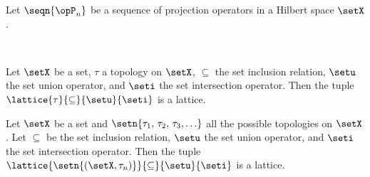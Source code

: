 \begin{minipage}[c]{\tw-40mm}
\begin{example}
\footnotemark
Let $\seqn{\opP_n}$ be a sequence of projection operators in a Hilbert space $\setX$.
\end{example}
\end{minipage}%
\hfill%
%
\hfill{}\hfill\mbox{}\\%

\begin{example}
Let $\setX$ be a set, $\tau$ a topology on $\setX$,
$\subseteq$ the set inclusion relation,
$\setu$ the set union operator,
and $\seti$ the set intersection operator.
Then the tuple $\lattice{\tau}{\subseteq}{\setu}{\seti}$ is a lattice.
\end{example}


\begin{minipage}{\tw-70mm}%
  \begin{example}
  \label{ex:lat_tttt}
  \footnotemark
  Let $\setX$ be a set and $\setn{\tau_1,\, \tau_2,\, \tau_3,\ldots}$ all
  the possible topologies on $\setX$.
  Let $\subseteq$ be the set inclusion relation,
  $\setu$ the set union operator,
  and $\seti$ the set intersection operator.
  Then the tuple $\lattice{\setn{(\setX,\tau_n)}}{\subseteq}{\setu}{\seti}$ is a lattice.
  \end{example}
\end{minipage}%
%
\hfill{}\hfill\mbox{}\\%

